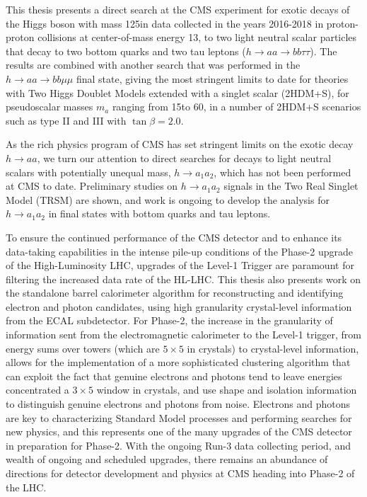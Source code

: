 This thesis presents a direct search at the CMS experiment for exotic decays of the Higgs boson with mass 125\GeV in data collected in the years 2016-2018 in proton-proton collisions at center-of-mass energy 13\TeV, to two light neutral scalar particles that decay to two bottom quarks and two tau leptons ($h \rightarrow aa \rightarrow bb\tau\tau$). The results are combined with another search that was performed in the $h \rightarrow aa \rightarrow bb\mu\mu$ final state, giving the most stringent limits to date for theories with Two Higgs Doublet Models extended with a singlet scalar (2HDM+S), for pseudoscalar masses $m_a$ ranging from 15\GeV to 60\GeV, in a number of 2HDM+S scenarios such as type II and III with $\tan\beta = 2.0$.

As the rich physics program of CMS has set stringent limits on the exotic decay $h \rightarrow aa$, we turn our attention to direct searches for decays to light neutral scalars with potentially unequal mass, $h \rightarrow a_1 a_2$, which has not been performed at CMS to date. Preliminary studies on $h \rightarrow a_1 a_2$ signals in the Two Real Singlet Model (TRSM) are shown, and work is ongoing to develop the analysis for $h \rightarrow a_1 a_2$ in final states with bottom quarks and tau leptons.

To ensure the continued performance of the CMS detector and to enhance its data-taking capabilities in the intense pile-up conditions of the Phase-2 upgrade of the High-Luminosity LHC, upgrades of the Level-1 Trigger are paramount for filtering the increased data rate of the HL-LHC. This thesis also presents work on the standalone barrel calorimeter algorithm for reconstructing and identifying electron and photon candidates, using high granularity crystal-level information from the ECAL subdetector. For Phase-2, the increase in the granularity of information sent from the electromagnetic calorimeter to the Level-1 trigger, from energy sums over towers (which are $5\times 5$ in crystals) to crystal-level information, allows for the implementation of a more sophisticated clustering algorithm that can exploit the fact that genuine electrons and photons tend to leave energies concentrated a $3 \times 5$ window in crystals, and use shape and isolation information to distinguish genuine electrons and photons from noise. Electrons and photons are key to characterizing Standard Model processes and performing searches for new physics, and this represents one of the many upgrades of the CMS detector in preparation for Phase-2. With the ongoing Run-3 data collecting period, and wealth of ongoing and scheduled upgrades, there remains an abundance of directions for detector development and physics at CMS heading into Phase-2 of the LHC.